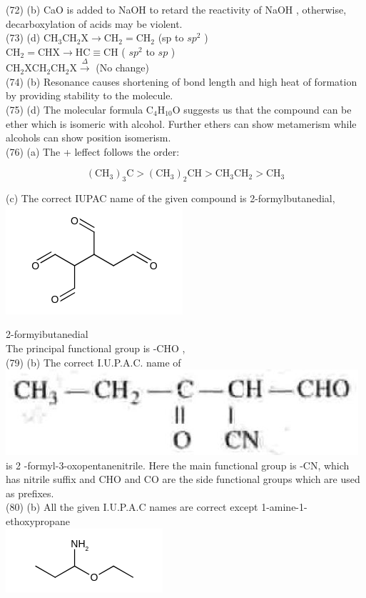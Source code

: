 \documentclass[10pt]{article}
\begin{document}
(72) (b) CaO is added to NaOH to retard the reactivity of NaOH , otherwise, decarboxylation of acids may be violent.\\
(73) (d) $\mathrm{CH}_{3} \mathrm{CH}_{2} \mathrm{X} \rightarrow \mathrm{CH}_{2}=\mathrm{CH}_{2}$ (sp to $s p^{2}$ )\\
$\mathrm{CH}_{2}=\mathrm{CHX} \rightarrow \mathrm{HC} \equiv \mathrm{CH}$ ( $s p^{2}$ to $s p$ )\\
$\mathrm{CH}_{2} \mathrm{XCH}_{2} \mathrm{CH}_{2} \mathrm{X} \xrightarrow{\Delta}$ (No change)\\
(74) (b) Resonance causes shortening of bond length and high heat of formation by providing stability to the molecule.\\
(75) (d) The molecular formula $\mathrm{C}_{4} \mathrm{H}_{10} \mathrm{O}$ suggests us that the compound can be ether which is isomeric with alcohol. Further ethers can show metamerism while alcohols can show position isomerism.\\
(76) (a) The + leffect follows the order:

$$
\left(\mathrm{CH}_{3}\right)_{3} \mathrm{C}>\left(\mathrm{CH}_{3}\right)_{2} \mathrm{CH}>\mathrm{CH}_{3} \mathrm{CH}_{2}>\mathrm{CH}_{3}
$$

(c) The correct IUPAC name of the given compound is 2-formylbutanedial,\\
\includegraphics{smile-fce0e6f9a5df8b581705fa0670d4fb3fa3c7776b}

2-formyibutanedial\\
The principal functional group is -CHO ,\\
(79) (b) The correct I.U.P.A.C. name of\\
\includegraphics[max width=\textwidth, center]{2025_01_28_8470952b98110cec3aabg-160}\\
is 2 -formyl-3-oxopentanenitrile. Here the main functional group is -CN, which has nitrile suffix and CHO and CO are the side functional groups which are used as prefixes.\\
(80) (b) All the given I.U.P.A.C names are correct except 1-amine-1-ethoxypropane\\
\includegraphics{smile-320803a9602b3b48a27e800326a18dcac20fb30d}
\end{document}
